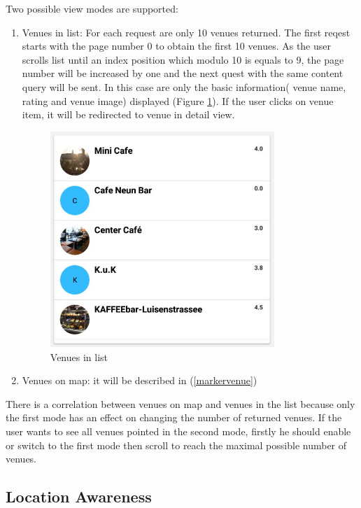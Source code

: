 Two possible view modes are supported:
 \begin{enumerate}
 	\item Venues in list: For each request are only 10 venues returned. The first reqest starts with the page number 0 to obtain the first 10 venues. As the user scrolls list until an index position which modulo 10 is equals to 9, the page number will be increased by one and the next quest with the same content query will be sent. In this case are only the basic information( venue name, rating and venue image) displayed (Figure \ref{fig:venuesInlist}). If the user clicks on venue item, it will be redirected to venue in detail view.
 	\begin{figure}[htbp]
 		\includegraphics[width=0.8\textwidth]{images/venuesonlist.jpg}
 		\centering
 		\caption[]{Venues in list}
 		\label{fig:venuesInlist}
 	\end{figure}
 	\item Venues on map: it will be described in (\ref{markervenue})
 \end{enumerate}
There is a correlation between venues on map and venues in the list because only the first mode has an effect on changing the number of returned venues. If the user wants to see all venues pointed in the second mode, firstly he should enable or switch to the first mode then scroll to reach the maximal possible number of venues. 

\subsection{Location Awareness}


